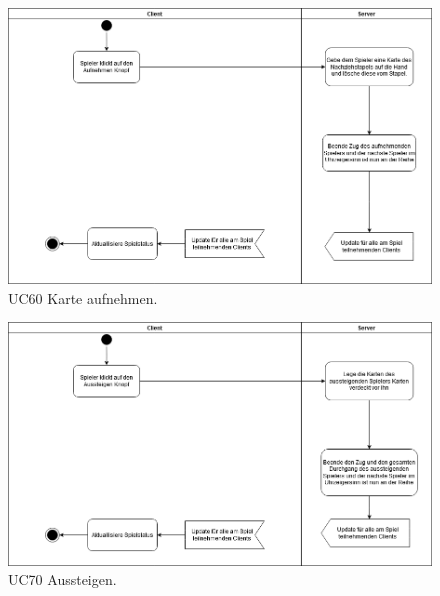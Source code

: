 \begin{figure}[h]
	\centering
	\includegraphics[width=\textwidth]{ad/UC60_Aufnehmen.png}
	\caption{UC60 Karte aufnehmen.}
\end{figure}

\begin{figure}[h]
	\centering
	\includegraphics[width=\textwidth]{ad/UC70_Aussteigen.png}
	\caption{UC70 Aussteigen.}
\end{figure}


